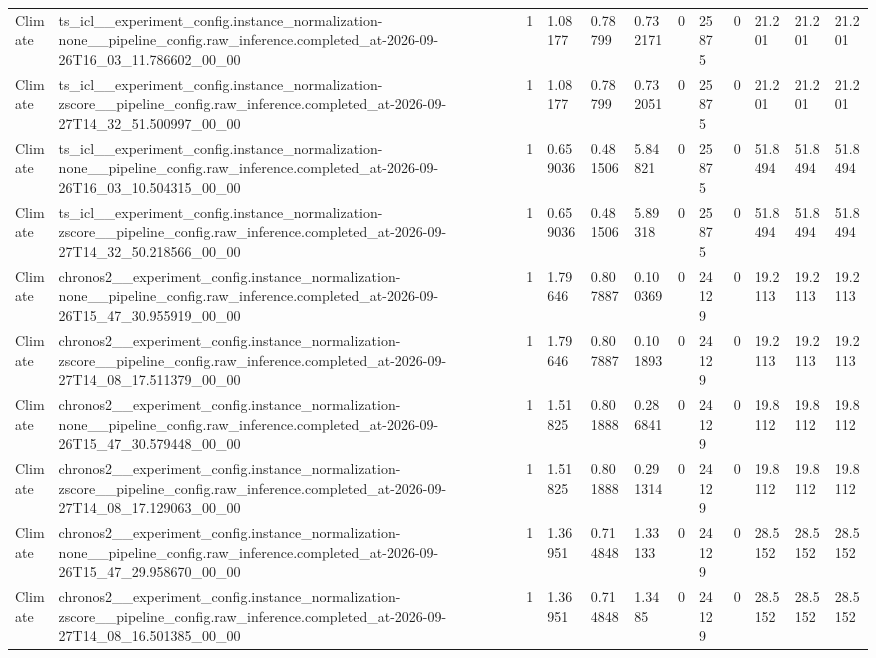 \begin{tabular}{llllllllllll}
Climate & ts\_icl\_\_experiment\_config.instance\_normalization-none\_\_pipeline\_config.raw\_inference.completed\_at-2026-09-26T16\_03\_11.786602\_00\_00 & 1 & 1.08177 & 0.78799 & 0.732171 & 0 & 25875 & 0 & 21.201 & 21.201 & 21.201 \\
Climate & ts\_icl\_\_experiment\_config.instance\_normalization-zscore\_\_pipeline\_config.raw\_inference.completed\_at-2026-09-27T14\_32\_51.500997\_00\_00 & 1 & 1.08177 & 0.78799 & 0.732051 & 0 & 25875 & 0 & 21.201 & 21.201 & 21.201 \\
Climate & ts\_icl\_\_experiment\_config.instance\_normalization-none\_\_pipeline\_config.raw\_inference.completed\_at-2026-09-26T16\_03\_10.504315\_00\_00 & 1 & 0.659036 & 0.481506 & 5.84821 & 0 & 25875 & 0 & 51.8494 & 51.8494 & 51.8494 \\
Climate & ts\_icl\_\_experiment\_config.instance\_normalization-zscore\_\_pipeline\_config.raw\_inference.completed\_at-2026-09-27T14\_32\_50.218566\_00\_00 & 1 & 0.659036 & 0.481506 & 5.89318 & 0 & 25875 & 0 & 51.8494 & 51.8494 & 51.8494 \\
Climate & chronos2\_\_experiment\_config.instance\_normalization-none\_\_pipeline\_config.raw\_inference.completed\_at-2026-09-26T15\_47\_30.955919\_00\_00 & 1 & 1.79646 & 0.807887 & 0.100369 & 0 & 24129 & 0 & 19.2113 & 19.2113 & 19.2113 \\
Climate & chronos2\_\_experiment\_config.instance\_normalization-zscore\_\_pipeline\_config.raw\_inference.completed\_at-2026-09-27T14\_08\_17.511379\_00\_00 & 1 & 1.79646 & 0.807887 & 0.101893 & 0 & 24129 & 0 & 19.2113 & 19.2113 & 19.2113 \\
Climate & chronos2\_\_experiment\_config.instance\_normalization-none\_\_pipeline\_config.raw\_inference.completed\_at-2026-09-26T15\_47\_30.579448\_00\_00 & 1 & 1.51825 & 0.801888 & 0.286841 & 0 & 24129 & 0 & 19.8112 & 19.8112 & 19.8112 \\
Climate & chronos2\_\_experiment\_config.instance\_normalization-zscore\_\_pipeline\_config.raw\_inference.completed\_at-2026-09-27T14\_08\_17.129063\_00\_00 & 1 & 1.51825 & 0.801888 & 0.291314 & 0 & 24129 & 0 & 19.8112 & 19.8112 & 19.8112 \\
Climate & chronos2\_\_experiment\_config.instance\_normalization-none\_\_pipeline\_config.raw\_inference.completed\_at-2026-09-26T15\_47\_29.958670\_00\_00 & 1 & 1.36951 & 0.714848 & 1.33133 & 0 & 24129 & 0 & 28.5152 & 28.5152 & 28.5152 \\
Climate & chronos2\_\_experiment\_config.instance\_normalization-zscore\_\_pipeline\_config.raw\_inference.completed\_at-2026-09-27T14\_08\_16.501385\_00\_00 & 1 & 1.36951 & 0.714848 & 1.3485 & 0 & 24129 & 0 & 28.5152 & 28.5152 & 28.5152 \\

\end{tabular}

